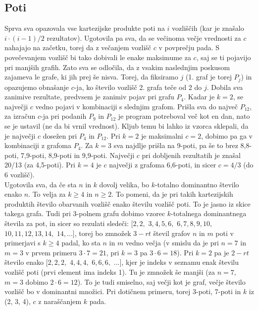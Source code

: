 \documentclass[12pt, a4paper]{article}
\begin{document}
\subsection{Poti}
Sprva sva opazovala vse kartezijske produkte poti na $i$ vozliščih (kar je znašalo $i\cdot(i-1)/2$ rezultatov). Ugotovila pa sva, da se večinoma večje vrednosti za $c$ nahajajo na začetku, torej da z večanjem vozlišč $c$ v povprečju pada. S povečevanjem vozlišč bi tako dobivali le enake maksimume za $c$, saj se ti pojavijo pri manjših grafih. Zato sva se odločila, da z vsakim naslednjim poskusom zajameva le grafe, ki jih prej še nisva. Torej, da fiksiramo $j$ (1. graf je torej $P_j$) in opazujemo obnašanje $c$-ja, ko število vozlišč 2. grafa teče od 2 do $j$. Dobila sva zanimive rezultate, predvsem je zanimiv pojav pri grafu $P_4$. Kadar je $k=2$, se največji $c$ vedno pojavi v kombinaciji s slednjim grafom. Prišla sva do največ $P_{12}$, za izračun $c$-ja pri podanih $P_9$ in $P_{12}$ je program potreboval več kot en dan, nato se je ustavil (ne da bi vrnil vrednost). Kljub temu bi lahko iz vzorca sklepali, da je največji $c$ dosežen pri $P_4$ in $P_{12}$. Pri $k=2$ je maksimalni $c=2$, dobimo pa ga v kombinaciji z grafoma $P_4$. Za $k=3$ sva najdlje prišla na 9-poti, pa še to brez 8,8-poti, 7,9-poti, 8,9-poti in 9,9-poti. Največji $c$ pri dobljenih rezultatih je znašal 20/13 (za 4,5-poti). Pri $k=4$ je $c$ največji z grafoma 6,6-poti, in sicer $c=4/3$ (do 6 vozlišč). \\
Ugotovila sva, da če sta $n$ in $k$ dovolj velika, bo $k$-totalno dominantno število enako $n$. To velja za $k \geq 4$ in $n \geq 2$. To pomeni, da je pri takih kartezijskih produktih število obarvanih vozlišč enako številu vozlišč poti. To je jasno iz skice takega grafa. Tudi pri 3-polnem grafu dobimo vzorec $k$-totalnega dominantnega števila za pot, in sicer so rezulati sledeči: $[2,2,$ $3,4,5,6,$ $6,7,8,9,10,$ $10,11,12,13,14,$ $14, ...]$, torej bo zmnožek $3-rt$ števil grafov $n$ in $m$ poti v primerjavi s $k \geq 4$ padal, ko sta $n$ in $m$ vedno večja (v smislu da je pri $n=7$ in $m=3$ v prvem primeru $3 \cdot 7=21$, pri $k=3$ pa $3 \cdot 6=18$). Pri $k=2$ pa je $2-rt$ število enako $[2,2,2,$ $4,4,4,$ $6,6,6,$ $...]$, kjer je indeks v seznamu enak številu vozlišč poti (prvi element ima indeks 1). Tu je zmnožek še manjši (za $n=7$, $m=3$ dobimo $2 \cdot 6=12$). To je tudi smiselno, saj večji kot je graf, večje število vozlišč bo v dominantni množici. Pri dotičnem primeru, torej 3-poti, 7-poti in $k$ iz (2, 3, 4), $c$ z naraščanjem $k$ pada.\\
\end{document}
